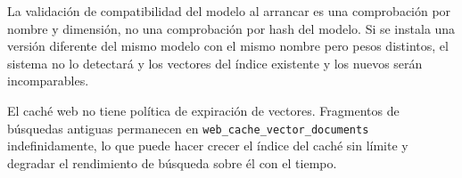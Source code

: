 \documentclass[11pt]{article}
\begin{document}
La validación de compatibilidad del modelo al arrancar es una comprobación por nombre y
dimensión, no una comprobación por hash del modelo. Si se instala una versión diferente del
mismo modelo con el mismo nombre pero pesos distintos, el sistema no lo detectará y los
vectores del índice existente y los nuevos serán incomparables.

El caché web no tiene política de expiración de vectores. Fragmentos de búsquedas antiguas
permanecen en \texttt{web\_cache\_vector\_documents} indefinidamente, lo que puede hacer
crecer el índice del caché sin límite y degradar el rendimiento de búsqueda sobre él con el
tiempo.
\end{document}
